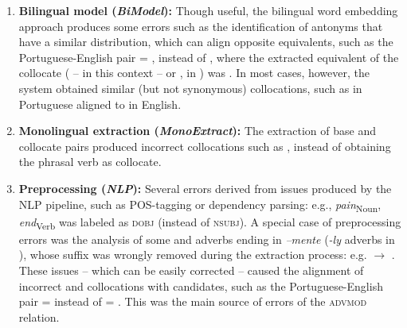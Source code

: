 \documentclass[output=paper,modfonts,nonflat]{langsci/langscibook}
\begin{document}
\begin{enumerate}
\item \textbf{Bilingual model (\textit{BiModel}):} Though useful, the bilingual word embedding approach
  produces some errors such as the identification of antonyms that have a similar distribution, which can align opposite 
  equivalents, such as the Portuguese-English pair  = , instead of , where the extracted equivalent of the collocate  ( -- in this context -- or , in )
  was . In most cases, however, the system obtained similar
  (but not synonymous) collocations, such as  in Portuguese aligned to  in English.

\item \textbf{Monolingual extraction (\textit{MonoExtract}):} The extraction of base and
  collocate pairs produced incorrect collocations such as
  ,
  instead of obtaining the phrasal verb  as collocate.  
  
\item \textbf{Preprocessing (\textit{NLP}):} Several errors derived from issues produced
  by the NLP pipeline, such as POS-tagging or dependency parsing:
  e.g., \textit{pain}\textsubscript{Noun},\\\textit{end}\textsubscript{Verb} was labeled
  as \textsc{dobj} (instead of \textsc{nsubj}).
  A special case of preprocessing errors was the analysis of some 
  and  adverbs ending in \emph{--mente} (\emph{-ly} adverbs in ),
  whose suffix was wrongly removed during the extraction process: e.g.  $\rightarrow$ . These issues -- which can be easily corrected --
  caused the alignment of incorrect  and   collocations with
   candidates, such as the Portuguese-English pair  =  instead of  = . This was the main source of errors of the \textsc{advmod} relation.


\end{enumerate}
\end{document}
